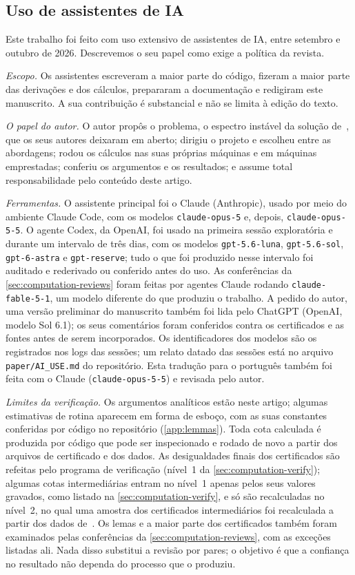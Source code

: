 \subsection{Uso de assistentes de IA}\label{sec:computation-ai}

Este trabalho foi feito com uso extensivo de assistentes de IA, entre setembro e outubro de 2026. Descrevemos o seu papel
como exige a política da revista.

\emph{Escopo.} Os assistentes escreveram a maior parte do código, fizeram a maior parte das derivações e dos cálculos, prepararam
a documentação e redigiram este manuscrito. A sua contribuição é substancial e não se limita à edição do
texto.

\emph{O papel do autor.} O autor propôs o problema, o espectro instável da solução de~\cite{RT2019}, que
os seus autores deixaram em aberto; dirigiu o projeto e escolheu entre as abordagens; rodou os cálculos nas suas próprias
máquinas e em máquinas emprestadas; conferiu os argumentos e os resultados; e assume total responsabilidade pelo conteúdo
deste artigo.

\emph{Ferramentas.} O assistente principal foi o Claude (Anthropic), usado por meio do ambiente Claude Code, com os modelos
\texttt{claude-opus-5} e, depois, \texttt{claude-opus-5-5}. O agente Codex, da OpenAI, foi usado na primeira sessão
exploratória e durante um intervalo de três dias, com os modelos \texttt{gpt-5.6-luna}, \texttt{gpt-5.6-sol},
\texttt{gpt-6-astra} e \texttt{gpt-reserve}; tudo o que foi produzido nesse intervalo foi auditado e rederivado ou
conferido antes do uso. As conferências da \cref{sec:computation-reviews} foram feitas por agentes Claude rodando
\texttt{claude-fable-5-1}, um modelo diferente do que produziu o trabalho. A pedido do autor, uma versão preliminar do
manuscrito também foi lida pelo ChatGPT (OpenAI, modelo Sol 6.1); os seus comentários foram conferidos contra os certificados e
as fontes antes de serem incorporados. Os identificadores dos modelos são os registrados nos logs das sessões; um relato datado das sessões está no arquivo \texttt{paper/AI\_USE.md} do
repositório. Esta tradução para o português também foi feita com o Claude (\texttt{claude-opus-5-5}) e revisada pelo autor.

\emph{Limites da verificação.} Os argumentos analíticos estão neste artigo; algumas estimativas de rotina aparecem em
forma de esboço, com as suas constantes conferidas por código no repositório (\cref{app:lemmas}). Toda cota calculada é
produzida por código que pode ser inspecionado e rodado de novo a partir dos arquivos de certificado e dos dados. As desigualdades finais dos
certificados são refeitas pelo programa de verificação (nível~1 da \cref{sec:computation-verify}); algumas cotas
intermediárias entram no nível~1 apenas pelos seus valores gravados, como listado na \cref{sec:computation-verify}, e só são recalculadas
no nível~2, no qual uma amostra dos certificados intermediários foi recalculada a partir dos dados
de~\cite{RT2019}. Os lemas e a maior parte dos certificados também foram
examinados pelas conferências da \cref{sec:computation-reviews}, com as exceções listadas ali. Nada disso substitui a
revisão por pares; o objetivo é que a confiança no resultado não dependa do processo que o produziu.
